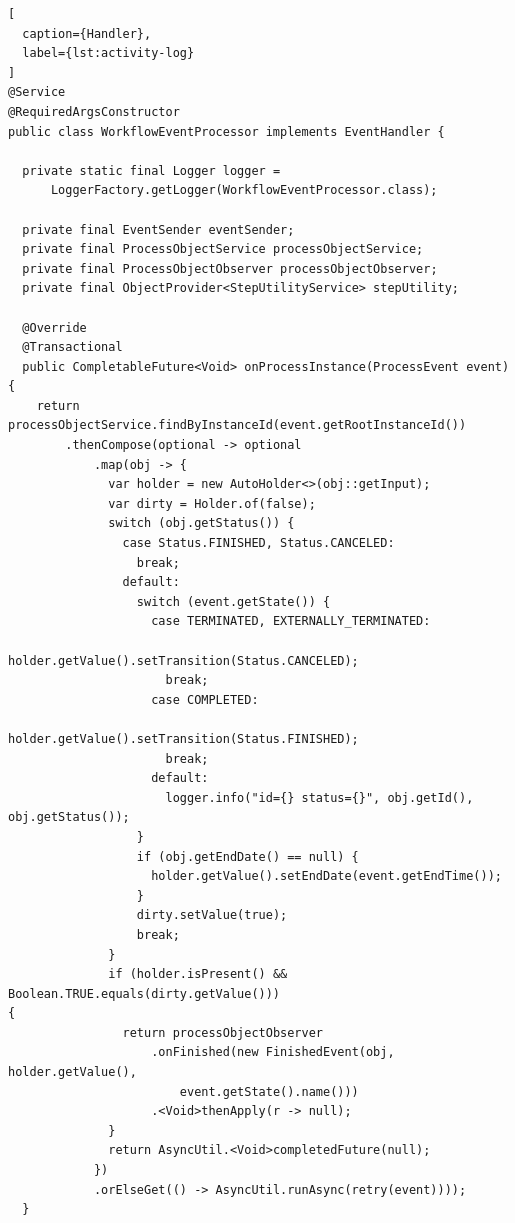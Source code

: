 
\begin{lstlisting}[
  caption={Handler},
  label={lst:activity-log}
]
@Service
@RequiredArgsConstructor
public class WorkflowEventProcessor implements EventHandler {

  private static final Logger logger =
      LoggerFactory.getLogger(WorkflowEventProcessor.class);

  private final EventSender eventSender;
  private final ProcessObjectService processObjectService;
  private final ProcessObjectObserver processObjectObserver;
  private final ObjectProvider<StepUtilityService> stepUtility;

  @Override
  @Transactional
  public CompletableFuture<Void> onProcessInstance(ProcessEvent event) {
    return processObjectService.findByInstanceId(event.getRootInstanceId())
        .thenCompose(optional -> optional
            .map(obj -> {
              var holder = new AutoHolder<>(obj::getInput);
              var dirty = Holder.of(false);
              switch (obj.getStatus()) {
                case Status.FINISHED, Status.CANCELED:
                  break;
                default:
                  switch (event.getState()) {
                    case TERMINATED, EXTERNALLY_TERMINATED:
                      holder.getValue().setTransition(Status.CANCELED);
                      break;
                    case COMPLETED:
                      holder.getValue().setTransition(Status.FINISHED);
                      break;
                    default:
                      logger.info("id={} status={}", obj.getId(),
obj.getStatus());
                  }
                  if (obj.getEndDate() == null) {
                    holder.getValue().setEndDate(event.getEndTime());
                  }
                  dirty.setValue(true);
                  break;
              }
              if (holder.isPresent() && Boolean.TRUE.equals(dirty.getValue()))
{
                return processObjectObserver
                    .onFinished(new FinishedEvent(obj, holder.getValue(),
                        event.getState().name()))
                    .<Void>thenApply(r -> null);
              }
              return AsyncUtil.<Void>completedFuture(null);
            })
            .orElseGet(() -> AsyncUtil.runAsync(retry(event))));
  }


\end{lstlisting}
